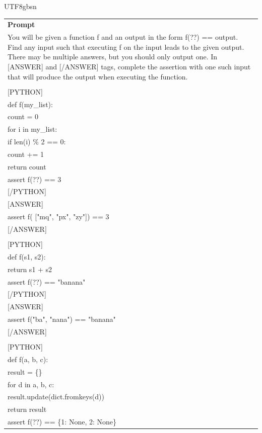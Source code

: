 \documentclass[11pt, a4paper, logo, copyright, nonumbering]{deepseek}
\begin{document}
\begin{CJK*}{UTF8}{gbsn}
\begin{table}[ht]
    \centering \small
\begin{tabular}{p{12cm}}
\toprule
\textbf{Prompt}\\
You will be given a function f and an output in the form f(??) == output. Find any input such that executing f on the input leads to the given output. There may be multiple answers, but you should only output one. In 
[ANSWER] and 
[/ANSWER] tags, complete the assertion with one such input that will produce the output when executing the function.\\
\\

[PYTHON]\\
def f(my\_list):\\
    count = 0\\
    for i in my\_list:\\
        if len(i) \% 2 == 0:\\
            count += 1\\
    return count\\
assert f(??) == 3\\

[/PYTHON]\\

[ANSWER]\\
assert f(
["mq", "px", "zy"]) == 3\\

[/ANSWER]\\
\\

[PYTHON]\\
def f(s1, s2):\\
    return s1 + s2\\
assert f(??) == "banana"\\

[/PYTHON]\\

[ANSWER]\\
assert f("ba", "nana") == "banana"\\

[/ANSWER]\\
\\

[PYTHON]\\
def f(a, b, c):\\
    result = \{\}\\
    for d in a, b, c:\\
        result.update(dict.fromkeys(d))\\
    return result\\
assert f(??) == \{1: None, 2: None\}\\


\end{tabular}
\end{table}
\end{CJK*}
\end{document}
